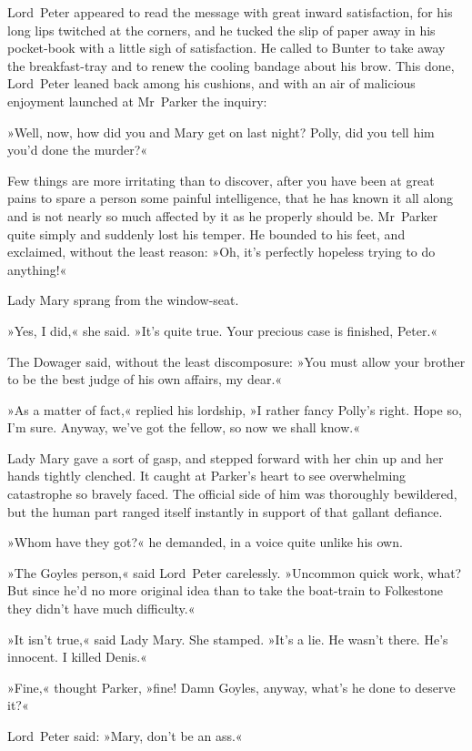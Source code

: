 Lord~Peter appeared to read the message with great inward satisfaction, for his long lips twitched at the corners, and he tucked the slip of paper away in his pocket-book with a little sigh of satisfaction. He called to Bunter to take away the breakfast-tray and to renew the cooling bandage about his brow. This done, Lord~Peter leaned back among his cushions, and with an air of malicious enjoyment launched at Mr~Parker the inquiry:

»Well, now, how did you and Mary get on last night? Polly, did you tell him you'd done the murder?«

Few things are more irritating than to discover, after you have been at great pains to spare a person some painful intelligence, that he has known it all along and is not nearly so much affected by it as he properly should be. Mr~Parker quite simply and suddenly lost his temper. He bounded to his feet, and exclaimed, without the least reason: »Oh, it's perfectly hopeless trying to do anything!«

Lady Mary sprang from the window-seat.

»Yes, I did,« she said. »It's quite true. Your precious case is finished, Peter.«

The Dowager said, without the least discomposure: »You must allow your brother to be the best judge of his own affairs, my dear.«

»As a matter of fact,« replied his lordship, »I rather fancy Polly's right. Hope so, I'm sure. Anyway, we've got the fellow, so now we shall know.«

Lady Mary gave a sort of gasp, and stepped forward with her chin up and her hands tightly clenched. It caught at Parker's heart to see overwhelming catastrophe so bravely faced. The official side of him was thoroughly bewildered, but the human part ranged itself instantly in support of that gallant defiance.

»Whom have they got?« he demanded, in a voice quite unlike his own.

»The Goyles person,« said Lord~Peter carelessly. »Uncommon quick work, what? But since he'd no more original idea than to take the boat-train to Folkestone they didn't have much difficulty.«

»It isn't true,« said Lady Mary. She stamped. »It's a lie. He wasn't there. He's innocent. I killed Denis.«

»Fine,« thought Parker, »fine! Damn Goyles, anyway, what's he done to deserve it?«

Lord~Peter said: »Mary, don't be an ass.«


